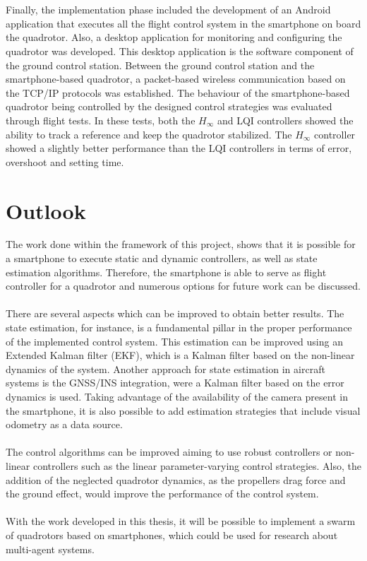 \\\\
Finally, the implementation phase included the development of an Android application that executes all the flight control system in the smartphone on board the quadrotor. Also, a desktop application for monitoring and configuring the quadrotor was developed. This desktop application is the software component of the ground control station. Between the ground control station and the smartphone-based quadrotor, a packet-based wireless communication based on the TCP/IP protocols was established. The behaviour of the smartphone-based quadrotor being controlled by the designed control strategies was evaluated through flight tests. In these tests, both the $H_\infty$ and LQI controllers showed the ability to track a reference and keep the quadrotor stabilized. The $H_\infty$ controller showed a slightly better performance than the LQI controllers in terms of error, overshoot and setting time.


\section{Outlook}
The work done within the framework of this project, shows that it is possible for a smartphone to execute static and dynamic controllers, as well as state estimation algorithms. Therefore, the smartphone is able to serve as flight controller for a quadrotor and numerous options for future work can be discussed.
\\\\
There are several aspects which can be improved to obtain better results. The state estimation, for instance, is a fundamental pillar in the proper performance of the implemented control system. This estimation can be improved using an Extended Kalman filter (EKF), which is a Kalman filter based on the non-linear dynamics of the system. Another approach for state estimation in aircraft systems is the GNSS/INS integration, were a Kalman filter based on the error dynamics is used. Taking advantage of the availability of the camera present in the smartphone, it is also possible to add estimation strategies that include visual odometry as a data source.
\\\\
The control algorithms can be improved aiming to use robust controllers or non-linear controllers such as the linear parameter-varying control strategies. Also, the addition of the neglected quadrotor dynamics, as the propellers drag force and the ground effect, would improve the performance of the control system.
\\\\
With the work developed in this thesis, it will be possible to implement a swarm of quadrotors based on smartphones, which could be used for research about multi-agent systems.